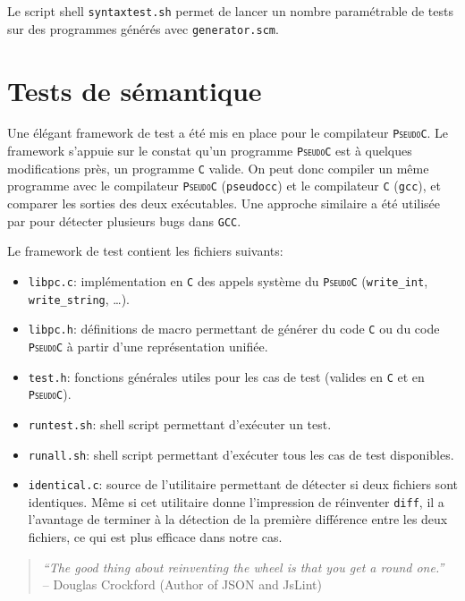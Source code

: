 \documentclass[12pt,a4paper,openright]{report}
\newcommand{\nom}[1]{\textsc{\texttt{#1}}}
\newcommand{\pc}{\nom{PseudoC}}
\newcommand{\ce}{\nom{C}}
\begin{document}
        Le script shell \texttt{syntaxtest.sh} permet de lancer un
        nombre paramétrable de tests sur des programmes
        générés avec \texttt{generator.scm}.

    \section{Tests de sémantique}
        Une élégant framework de test a été mis en place pour le compilateur
        \pc. Le framework s'appuie sur le constat qu'un programme \pc{} est à
        quelques modifications près, un programme \ce{} valide. On peut donc
        compiler un même programme avec le compilateur \pc{} (\texttt{pseudocc})
        et le compilateur \ce{} (\texttt{gcc}), et comparer les sorties des deux
        exécutables. Une approche similaire a été utilisée par \cite{FS} pour
        détecter plusieurs bugs dans \nom{GCC}.


        Le framework de test contient les fichiers suivants:

        \begin{itemize}
            \item \texttt{libpc.c}: implémentation en \ce{} des appels
            système du \pc{} (\texttt{write\_int}, \texttt{write\_string},
            \ldots).
            \item \texttt{libpc.h}: définitions de macro permettant
            de générer du code \ce{} ou du code \pc{} à partir d'une représentation
            unifiée.
            \item \texttt{test.h}: fonctions générales utiles
            pour les cas de test (valides en \ce{} et en \pc).
            \item \texttt{runtest.sh}: shell script permettant d'exécuter un
            test.
            \item \texttt{runall.sh}: shell script permettant d'exécuter tous
            les cas de test disponibles.
            \item \texttt{identical.c}: source de l'utilitaire permettant de
            détecter si deux fichiers sont identiques. Même si cet utilitaire
            donne l'impression de réinventer \texttt{diff}, il a l'avantage de
            terminer à la détection de la première différence entre les deux
            fichiers, ce qui est plus efficace dans notre cas.
        \end{itemize}

\begin{quote}
\emph{``The good thing about reinventing the wheel is that you get a round
one.''} \\
-- Douglas Crockford (Author of JSON and JsLint)
\end{quote}
\end{document}
